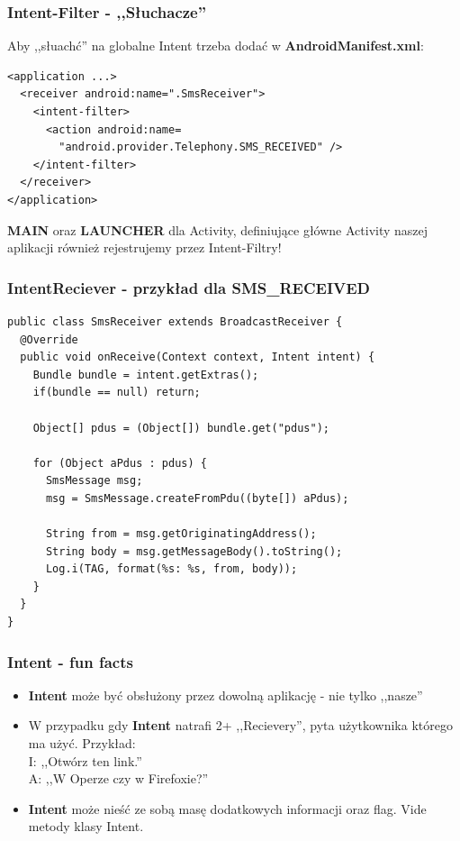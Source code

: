 \begin{frame}[fragile]\frametitle{Intent-Filter - ,,Słuchacze''}
Aby ,,słuachć'' na globalne Intent trzeba dodać w \textbf{AndroidManifest.xml}:
\begin{lstlisting}
<application ...>
  <receiver android:name=".SmsReceiver"> 
    <intent-filter> 
      <action android:name=
        "android.provider.Telephony.SMS_RECEIVED" /> 
    </intent-filter> 
  </receiver>
</application>
\end{lstlisting}

\pause

\textbf{MAIN} oraz \textbf{LAUNCHER} dla Activity, definiujące główne Activity naszej aplikacji również rejestrujemy przez Intent-Filtry!

\end{frame}

\begin{frame}[fragile]\frametitle{IntentReciever - przykład dla \textbf{SMS\_RECEIVED}}
\begin{lstlisting}
public class SmsReceiver extends BroadcastReceiver {
  @Override
  public void onReceive(Context context, Intent intent) {
    Bundle bundle = intent.getExtras();
    if(bundle == null) return;

    Object[] pdus = (Object[]) bundle.get("pdus");

    for (Object aPdus : pdus) {
      SmsMessage msg;
      msg = SmsMessage.createFromPdu((byte[]) aPdus);
      
      String from = msg.getOriginatingAddress();
      String body = msg.getMessageBody().toString();
      Log.i(TAG, format(%s: %s, from, body));                     
    }
  }
}
\end{lstlisting}
\end{frame}


\begin{frame}\frametitle{Intent - fun facts}
\begin{itemize}
 \item \textbf{Intent} może być obsłużony przez dowolną aplikację - nie tylko ,,nasze''
 \pause \item W przypadku gdy \textbf{Intent} natrafi 2+ ,,Recievery'', pyta użytkownika którego ma użyć. Przykład: \\
              \pause I: ,,Otwórz ten link.''\\
              \pause A: ,,W Operze czy w Firefoxie?''
              
             
 \pause \item \textbf{Intent} może nieść ze sobą masę dodatkowych informacji oraz flag. Vide metody klasy Intent.
\end{itemize}
\end{frame}










% 
